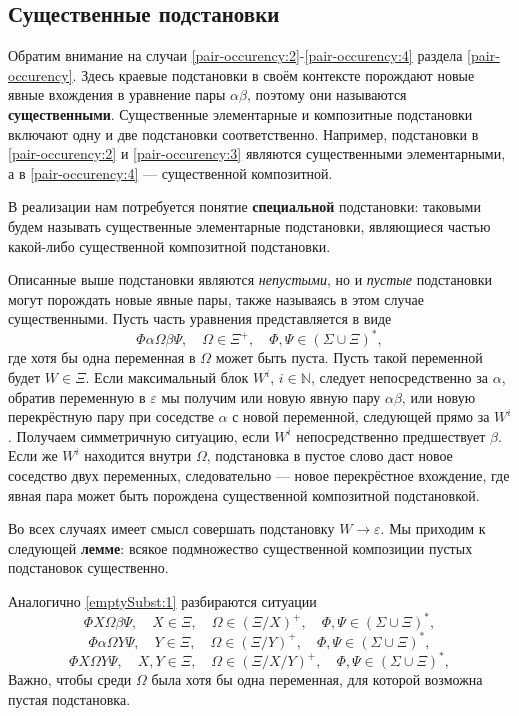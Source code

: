 \documentclass[12pt]{article}
\begin{document}
\subsection{Существенные подстановки} \label{essential-substs}

Обратим внимание на случаи \eqref{pair-occurency:2}-\eqref{pair-occurency:4}
раздела \ref{pair-occurency}. Здесь краевые подстановки в своём контексте
порождают новые явные вхождения в уравнение пары $\alpha \beta$, поэтому они
называются \textbf{существенными}. Существенные элементарные и композитные
подстановки включают одну и две подстановки соответственно. Например,
подстановки в \eqref{pair-occurency:2} и \eqref{pair-occurency:3} являются
существенными элементарными, а в \eqref{pair-occurency:4} --- существенной
композитной.

В реализации нам потребуется понятие \textbf{специальной} подстановки: таковыми
будем называть существенные элементарные подстановки, являющиеся частью
какой-либо существенной композитной подстановки.

Описанные выше подстановки являются \textit{непустыми}, но и \textit{пустые}
подстановки могут порождать новые явные пары, также называясь в этом случае
существенными. Пусть часть уравнения представляется в виде
\begin{equation} \label{emptySubst:1}
  \Phi \alpha \Omega \beta \Psi, \quad \Omega \in \Xi^+, \quad \Phi, \Psi \in
  (\Sigma \cup \Xi)^*,
\end{equation}
где хотя бы одна переменная в $\Omega$ может быть пуста. Пусть такой переменной
будет $W \in \Xi$. Если максимальный блок $W^i$, $i \in \mathbb{N}$, следует
непосредственно за $\alpha$, обратив переменную в $\varepsilon$ мы получим или
новую явную пару $\alpha \beta$, или новую перекрёстную пару при соседстве
$\alpha$ с новой переменной, следующей прямо за $W^i$. Получаем симметричную
ситуацию, если $W^i$ непосредственно предшествует $\beta$. Если же $W^i$
находится внутри $\Omega$, подстановка в пустое слово даст новое соседство двух
переменных, следовательно --- новое перекрёстное вхождение, где явная пара
может быть порождена существенной композитной подстановкой.

Во всех случаях имеет смысл совершать подстановку $W \to \varepsilon$. Мы
приходим к следующей \textbf{лемме}: всякое подмножество существенной
композиции пустых подстановок существенно.

Аналогично \eqref{emptySubst:1} разбираются ситуации
\begin{equation}
  \Phi X \Omega \beta \Psi, \quad X \in \Xi, \quad \Omega \in (\Xi / X)^+,
  \quad \Phi, \Psi \in (\Sigma \cup \Xi)^*,
\end{equation}
\begin{equation}
  \Phi \alpha \Omega Y \Psi, \quad Y \in \Xi, \quad \Omega \in (\Xi / Y)^+,
  \quad \Phi, \Psi \in (\Sigma \cup \Xi)^*,
\end{equation}
\begin{equation}
  \Phi X \Omega Y \Psi, \quad X, Y \in \Xi, \quad \Omega \in (\Xi / X / Y)^+,
  \quad \Phi, \Psi \in (\Sigma \cup \Xi)^*,
\end{equation}
Важно, чтобы среди $\Omega$ была хотя бы одна переменная, для которой возможна
пустая подстановка.
\end{document}

